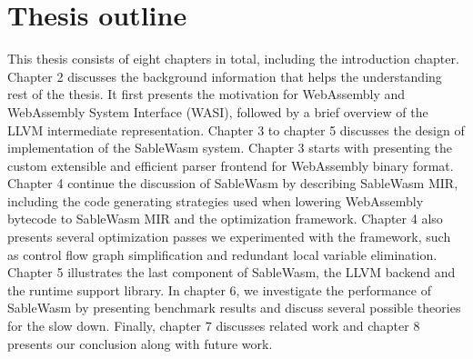 \section*{Thesis outline}

This thesis consists of eight chapters in total, including the introduction chapter. Chapter 2 discusses the background information that helps the understanding rest of the thesis. It first presents the motivation for WebAssembly and WebAssembly System Interface (WASI), followed by a brief overview of the LLVM intermediate representation. Chapter 3 to chapter 5 discusses the design of implementation of the SableWasm system. Chapter 3 starts with presenting the custom extensible and efficient parser frontend for WebAssembly binary format. Chapter 4 continue the discussion of SableWasm by describing SableWasm MIR, including the code generating strategies used when lowering WebAssembly bytecode to SableWasm MIR and the optimization framework. Chapter 4 also presents several optimization passes we experimented with the framework, such as control flow graph simplification and redundant local variable elimination. Chapter 5 illustrates the last component of SableWasm, the LLVM backend and the runtime support library. In chapter 6, we investigate the performance of SableWasm by presenting benchmark results and discuss several possible theories for the slow down. Finally, chapter 7 discusses related work and chapter 8 presents our conclusion along with future work.